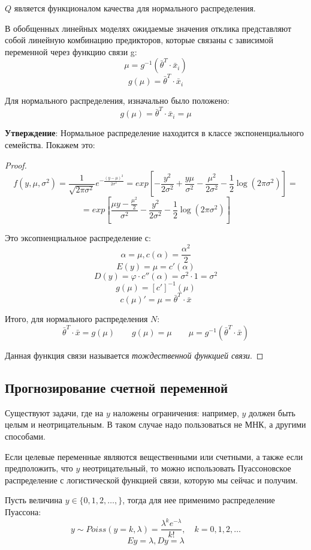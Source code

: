 \documentclass[aps,%
12pt,%
final,%
oneside,
onecolumn,%
musixtex, %
superscriptaddress,%
centertags]{article} %
\theoremstyle{plain}
\theoremstyle{definition}
\theoremstyle{remark}
\begin{document}
$Q$ является функционалом качества для нормального распределения.

В обобщенных линейных моделях ожидаемые значения отклика представляют
собой линейную комбинацию предикторов, которые связаны с зависимой переменной
через функцию связи g:
$$\mu = g^{-1}(\left .\bar{\theta}\right .^T \cdot \bar{x}_i)$$
$$g(\mu) = \left .\bar{\theta}\right .^T \cdot \bar{x}_i$$

Для нормального распределения, изначально было положено:
$$g(\mu) = \left .\bar{\theta}\right .^T \cdot \bar{x}_i = \mu$$

\textbf{Утверждение}: Нормальное распределение находится в классе экспоненциального семейства. Покажем это:
\begin{proof}
	$$f(y,\mu,\sigma^2) = \frac{1}{\sqrt{2\pi\sigma^2}} e^{-\frac{(y-\mu)^2}{2\sigma^2}} = exp \left[-\frac{y^2}{2\sigma^2}+\frac{y \mu}{\sigma^2} -\frac{\mu^2}{2\sigma^2} - \frac{1}{2} \log (2\pi \sigma^2)\right] = $$
	$$ = exp \left[ \frac{\mu y - \frac{\mu^2}{2}}{\sigma^2} - \frac{y^2}{2\sigma^2} - \frac{1}{2} \log (2\pi \sigma^2)\right]$$

	Это эксопненциальное распределение с:
	$$\alpha = \mu,  c(\alpha) = \frac{\alpha^2}{2}$$
	$$E(y) = \mu  = c' (\alpha)$$
	$$D(y) = \varphi \cdot c''(\alpha) = \sigma^2 \cdot 1 = \sigma^2 $$
	$$g(\mu)  =[c']^{-1}(\mu)$$
	$$c(\mu)' = \mu =\left .\bar{\theta}\right .^T \cdot \bar{x} $$

	Итого, для нормального распределения $N$:
	$$\left .\bar{\theta}\right .^T \cdot \bar{x} = g(\mu) \qquad g(\mu)=\mu \qquad \mu = g^{-1}(\left .\bar{\theta}\right .^T \cdot \bar{x})$$

	Данная функция связи называется \textit{тождественной функцией связи}.
\end{proof}

\newpage
\subsection{Прогнозирование счетной переменной}

Существуют задачи, где на $y$ наложены ограничения: например, $y$ должен быть целым и неотрицательным. В таком случае надо пользоваться не МНК, а другими способами. 

Если целевые переменные являются вещественными или счетными, а также если предположить, что $y$ неотрицательный, то можно использовать Пуассоновское распределение с логистической функцией связи, которую мы сейчас и получим.

Пусть величина $y \in \{0,1,2,\ldots, \}$, тогда для нее применимо распределение Пуассона:
$$y \sim Poiss(y=k, \lambda) = \frac{\lambda^k e^{-\lambda}}{k!}, \quad k =0, 1, 2,\ldots $$
$$Ey = \lambda, Dy = \lambda$$
\end{document}
